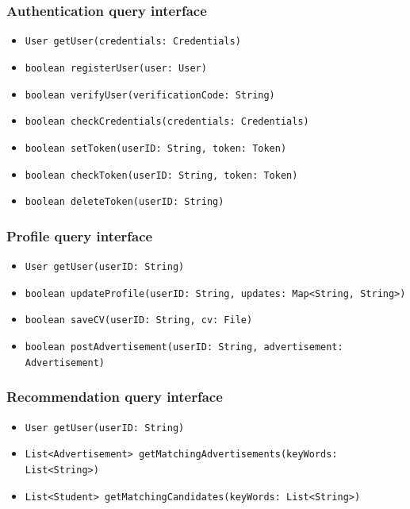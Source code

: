 \subsubsection{Authentication query interface}
\begin{itemize}
    \item \verb|User getUser(credentials: Credentials)|
    \item \verb|boolean registerUser(user: User)|
    \item \verb|boolean verifyUser(verificationCode: String)|
    \item \verb|boolean checkCredentials(credentials: Credentials)|
    \item \verb|boolean setToken(userID: String, token: Token)|
    \item \verb|boolean checkToken(userID: String, token: Token)|
    \item \verb|boolean deleteToken(userID: String)|
\end{itemize}

\subsubsection{Profile query interface}
\begin{itemize}
    \item \verb|User getUser(userID: String)|
    \item \verb|boolean updateProfile(userID: String, updates: Map<String, String>)|
    \item \verb|boolean saveCV(userID: String, cv: File)|
    \item \verb|boolean postAdvertisement(userID: String, advertisement: Advertisement)|
\end{itemize}

\subsubsection{Recommendation query interface}
\begin{itemize}
    \item \verb|User getUser(userID: String)|
    \item \verb|List<Advertisement> getMatchingAdvertisements(keyWords: List<String>)|
    \item \verb|List<Student> getMatchingCandidates(keyWords: List<String>)|
\end{itemize}

